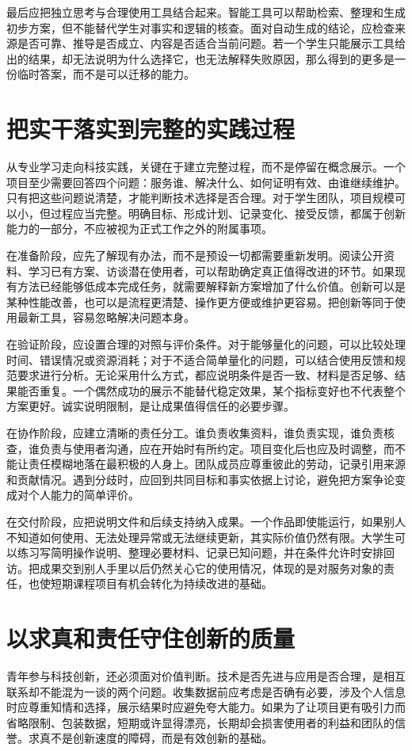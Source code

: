 \documentclass[UTF8,a4paper,zihao=-4,fontset=fandol]{ctexart}
\begin{document}
最后应把独立思考与合理使用工具结合起来。智能工具可以帮助检索、整理和生成初步方案，但不能替代学生对事实和逻辑的核查。面对自动生成的结论，应检查来源是否可靠、推导是否成立、内容是否适合当前问题。若一个学生只能展示工具给出的结果，却无法说明为什么选择它，也无法解释失败原因，那么得到的更多是一份临时答案，而不是可以迁移的能力。

\section{把实干落实到完整的实践过程}
从专业学习走向科技实践，关键在于建立完整过程，而不是停留在概念展示。一个项目至少需要回答四个问题：服务谁、解决什么、如何证明有效、由谁继续维护。只有把这些问题说清楚，才能判断技术选择是否合理。对于学生团队，项目规模可以小，但过程应当完整。明确目标、形成计划、记录变化、接受反馈，都属于创新能力的一部分，不应被视为正式工作之外的附属事项。

在准备阶段，应先了解现有办法，而不是预设一切都需要重新发明。阅读公开资料、学习已有方案、访谈潜在使用者，可以帮助确定真正值得改进的环节。如果现有方法已经能够低成本完成任务，就需要解释新方案增加了什么价值。创新可以是某种性能改善，也可以是流程更清楚、操作更方便或维护更容易。把创新等同于使用最新工具，容易忽略解决问题本身。

在验证阶段，应设置合理的对照与评价条件。对于能够量化的问题，可以比较处理时间、错误情况或资源消耗；对于不适合简单量化的问题，可以结合使用反馈和规范要求进行分析。无论采用什么方式，都应说明条件是否一致、材料是否足够、结果能否重复。一个偶然成功的展示不能替代稳定效果，某个指标变好也不代表整个方案更好。诚实说明限制，是让成果值得信任的必要步骤。

在协作阶段，应建立清晰的责任分工。谁负责收集资料，谁负责实现，谁负责核查，谁负责与使用者沟通，应在开始时有所约定。项目变化后也应及时调整，而不能让责任模糊地落在最积极的人身上。团队成员应尊重彼此的劳动，记录引用来源和贡献情况。遇到分歧时，应回到共同目标和事实依据上讨论，避免把方案争论变成对个人能力的简单评价。

在交付阶段，应把说明文件和后续支持纳入成果。一个作品即使能运行，如果别人不知道如何使用、无法处理异常或无法继续更新，其实际价值仍然有限。大学生可以练习写简明操作说明、整理必要材料、记录已知问题，并在条件允许时安排回访。把成果交到别人手里以后仍然关心它的使用情况，体现的是对服务对象的责任，也使短期课程项目有机会转化为持续改进的基础。

\section{以求真和责任守住创新的质量}
青年参与科技创新，还必须面对价值判断。技术是否先进与应用是否合理，是相互联系却不能混为一谈的两个问题。收集数据前应考虑是否确有必要，涉及个人信息时应尊重知情和选择，展示结果时应避免夸大能力。如果为了让项目更有吸引力而省略限制、包装数据，短期或许显得漂亮，长期却会损害使用者的利益和团队的信誉。求真不是创新速度的障碍，而是有效创新的基础。
\end{document}
